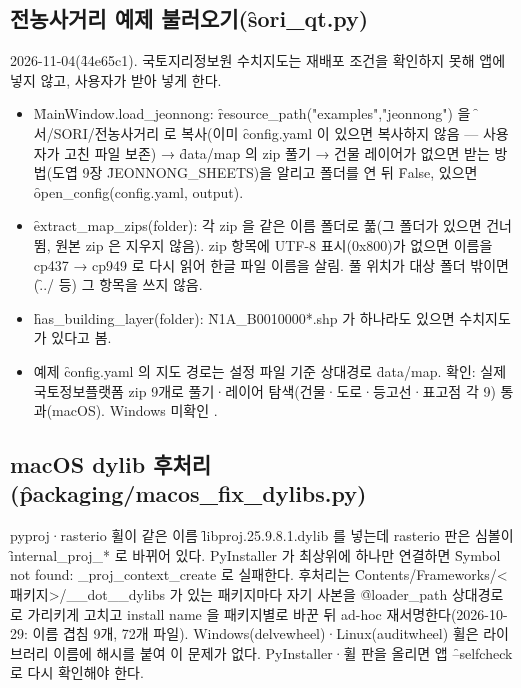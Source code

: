 \documentclass[10.5pt,a4paper]{article}
\begin{document}
\subsection{전농사거리 예제 불러오기(\f{sori\_qt.py})}
2026-11-04(\f{44e65c1}). 국토지리정보원 수치지도는 재배포 조건을 확인하지 못해 앱에 넣지 않고, 사용자가 받아 넣게 한다.
\begin{itemize}
\item \f{MainWindow.load\_jeonnong}: \f{resource\_path("examples","jeonnong")} 을 \f{문서/SORI/전농사거리} 로 복사(이미 \f{config.yaml} 이 있으면 복사하지 않음 — 사용자가 고친 파일 보존) → \f{data/map} 의 zip 풀기 → 건물 레이어가 없으면 받는 방법(도엽 9장 \f{JEONNONG\_SHEETS})을 알리고 폴더를 연 뒤 \f{False}, 있으면 \f{open\_config(config.yaml, output)}.
\item \f{extract\_map\_zips(folder)}: 각 zip 을 같은 이름 폴더로 풂(그 폴더가 있으면 건너뜀, 원본 zip 은 지우지 않음). zip 항목에 UTF-8 표시(0x800)가 없으면 이름을 cp437 → cp949 로 다시 읽어 한글 파일 이름을 살림. 풀 위치가 대상 폴더 밖이면(\f{../} 등) 그 항목을 쓰지 않음.
\item \f{has\_building\_layer(folder)}: \f{N1A\_B0010000*.shp} 가 하나라도 있으면 수치지도가 있다고 봄.
\item 예제 \f{config.yaml} 의 지도 경로는 설정 파일 기준 상대경로 \f{data/map}. 확인: 실제 국토정보플랫폼 zip 9개로 풀기·레이어 탐색(건물·도로·등고선·표고점 각 9) 통과(macOS). Windows 미확인 \chk.
\end{itemize}

\subsection{macOS dylib 후처리(\f{packaging/macos\_fix\_dylibs.py})}
pyproj·rasterio 휠이 같은 이름 \f{libproj.25.9.8.1.dylib} 를 넣는데 rasterio 판은 심볼이 \f{internal\_proj\_*} 로 바뀌어 있다. PyInstaller 가 최상위에 하나만 연결하면 \f{Symbol not found: \_proj\_context\_create} 로 실패한다. 후처리는 \f{Contents/Frameworks/<패키지>/\_\_dot\_\_dylibs} 가 있는 패키지마다 자기 사본을 \f{@loader\_path} 상대경로로 가리키게 고치고 install name 을 패키지별로 바꾼 뒤 ad-hoc 재서명한다(2026-10-29: 이름 겹침 9개, 72개 파일). Windows(delvewheel)·Linux(auditwheel) 휠은 라이브러리 이름에 해시를 붙여 이 문제가 없다. PyInstaller·휠 판을 올리면 앱 \f{--selfcheck} 로 다시 확인해야 한다.
\end{document}
